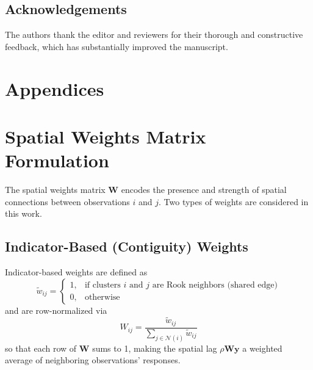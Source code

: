 \documentclass{article}[11pt]
\begin{document}
\subsection*{Acknowledgements}
The authors thank the editor and reviewers for their thorough and constructive feedback, which has substantially improved the manuscript.





\clearpage
\appendix
\renewcommand{\thesection}{\Alph{section}}

\section*{Appendices}

\section{Spatial Weights Matrix Formulation}\label{appendix:SpatialWeights}

The spatial weights matrix $\mathbf{W}$ encodes the presence and strength of spatial connections between observations $i$ and $j$. Two types of weights are considered in this work.

\subsection*{Indicator-Based (Contiguity) Weights}

Indicator-based weights are defined as
\begin{equation*}
    \tilde{w}_{ij} =
    \begin{cases}
        1, & \text{if clusters $i$ and $j$ are Rook neighbors (shared edge)}\\
        0, & \text{otherwise}
    \end{cases}
\end{equation*}
and are row-normalized via
\begin{equation*}
    W_{ij} = \frac{\tilde{w}_{ij}}{\displaystyle\sum_{j \in \mathcal{N}(i)} \tilde{w}_{ij}}
\end{equation*}
so that each row of $\mathbf{W}$ sums to 1, making the spatial lag $\rho\mathbf{Wy}$ a weighted average of neighboring observations' responses.
\end{document}
